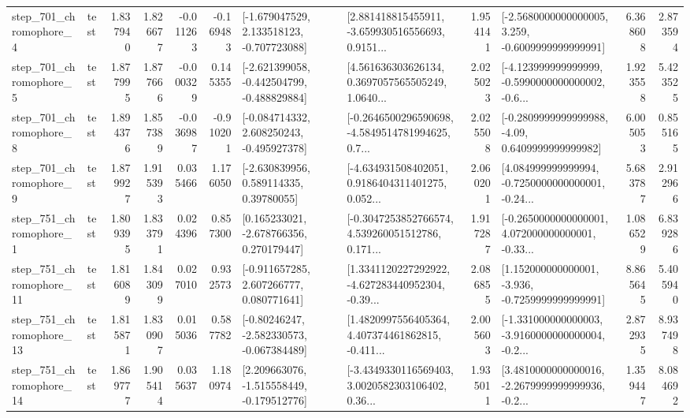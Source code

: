 \begin{tabular}{llrrrrllrlrr}
   step\_701\_chromophore\_4 &      test &      1.837940 &    1.826677 &     -0.011263 & -0.169483 &   [-1.679047529, 2.133518123, -0.707723088] &  [2.881418815455911, -3.659930516556693, 0.9151... &       1.954141 &  [-2.5680000000000005, 3.259, -0.6009999999999991] &            6.368608 &          2.873594 \\
   step\_701\_chromophore\_5 &      test &      1.877995 &    1.877666 &     -0.000329 &  0.145355 &  [-2.621399058, -0.442504799, -0.488829884] &  [4.561636303626134, 0.3697057565505249, 1.0640... &       2.025023 &  [-4.123999999999999, -0.5990000000000002, -0.6... &            1.923558 &          5.423525 \\
   step\_701\_chromophore\_8 &      test &      1.894376 &    1.857389 &     -0.036987 & -0.910201 &   [-0.084714332, 2.608250243, -0.495927378] &  [-0.2646500296590698, -4.5849514781994625, 0.7... &       2.025508 &   [-0.2809999999999988, -4.09, 0.6409999999999982] &            6.005053 &          0.855165 \\
   step\_701\_chromophore\_9 &      test &      1.879927 &    1.915393 &      0.035466 &  1.176050 &     [-2.630839956, 0.589114335, 0.39780055] &  [-4.634931508402051, 0.9186404311401275, 0.052... &       2.060201 &  [4.084999999999994, -0.7250000000000001, -0.24... &            5.683787 &          2.912966 \\
   step\_751\_chromophore\_1 &      test &      1.809395 &    1.833791 &      0.024396 &  0.857300 &    [0.165233021, -2.678766356, 0.270179447] &  [-0.3047253852766574, 4.539260051512786, 0.171... &       1.917287 &  [-0.2650000000000001, 4.072000000000001, -0.33... &            1.086529 &          6.839286 \\
  step\_751\_chromophore\_11 &      test &      1.816089 &    1.843099 &      0.027010 &  0.932573 &    [-0.911657285, 2.607266777, 0.080771641] &  [1.3341120227292922, -4.627283440952304, -0.39... &       2.086855 &   [1.152000000000001, -3.936, -0.7259999999999991] &            8.865645 &          5.405940 \\
  step\_751\_chromophore\_13 &      test &      1.815871 &    1.830907 &      0.015036 &  0.587782 &   [-0.80246247, -2.582330573, -0.067384489] &  [1.4820997556405364, 4.407374461862815, -0.411... &       2.005603 &  [-1.331000000000003, -3.9160000000000004, -0.2... &            2.872935 &          8.937498 \\
  step\_751\_chromophore\_14 &      test &      1.869777 &    1.905414 &      0.035637 &  1.180974 &   [2.209663076, -1.515558449, -0.179512776] &  [-3.4349330116569403, 3.0020582303106402, 0.36... &       1.935011 &  [3.4810000000000016, -2.2679999999999936, -0.2... &            1.359447 &          8.084692 \\

\end{tabular}
